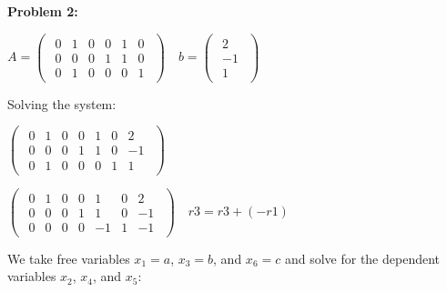 \textbf{Problem 2:}

\singlespacing

\begin{math}
    A=\begin{pmatrix}
        \begin{array}{cccccc}
            0 & 1 & 0 & 0 & 1 & 0 \\
            0 & 0 & 0 & 1 & 1 & 0 \\
            0 & 1 & 0 & 0 & 0 & 1
        \end{array}
    \end{pmatrix}\quad
    b=\begin{pmatrix}
        \begin{array}{cccccc}
            2  \\
            -1 \\
            1
        \end{array}
    \end{pmatrix}
\end{math}

\singlespacing

Solving the system:

\singlespacing

\begin{math}
    \begin{pmatrix}
        \begin{array}{cccccc|c}
            0 & 1 & 0 & 0 & 1 & 0 & 2  \\
            0 & 0 & 0 & 1 & 1 & 0 & -1 \\
            0 & 1 & 0 & 0 & 0 & 1 & 1
        \end{array}
    \end{pmatrix}\quad
\end{math}

\singlespacing

\begin{math}
    \begin{pmatrix}
        \begin{array}{cccccc|c}
            0 & 1 & 0 & 0 & 1  & 0 & 2  \\
            0 & 0 & 0 & 1 & 1  & 0 & -1 \\
            0 & 0 & 0 & 0 & -1 & 1 & -1
        \end{array}
    \end{pmatrix}\quad
    r3 = r3  + (-r1)
\end{math}

\singlespacing

We take free variables $x_1 = a$, $x_3 = b$, and $x_6 = c$ and
solve for the dependent variables $x_2$, $x_4$, and $x_5$:

